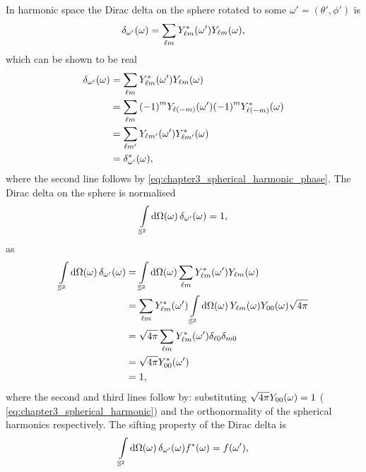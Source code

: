 In harmonic space the Dirac delta on the sphere rotated to some \(\omega'=(\theta',\phi')\) is
%
\begin{equation}
	\pixel{\delta_{\omega'}}
	= \harmonicSum \pixel[']{\conj{\harmonic{Y}}} \pixel{\harmonic{Y}},
\end{equation}
%
which can be shown to be real
%
\begin{align}\label{eq:chapter3_dirac_delta_real}
	\pixel{\delta_{\omega'}}
	 & = \harmonicSum \pixel[']{\conj{\harmonic{Y}}} \pixel{\harmonic{Y}} \nonumber{}                       \\
	 & = \harmonicSum {(-1)}^{m} \pixel[']{Y_{\ell(-m)}} {(-1)}^{m} \pixel{\conj{Y_{\ell(-m)}}} \nonumber{} \\
	 & = \sum\limits_{\ell m'} \pixel[']{Y_{\ell m'}} \pixel{\conj{Y_{\ell m'}}} \nonumber{}                \\
	 & = \pixel{\conj{\delta_{\omega'}}},
\end{align}
%
where the second line follows by \cref{eq:chapter3_spherical_harmonic_phase}.
The Dirac delta on the sphere is normalised
%
\begin{equation}
	\integrateSphere{\omega} \pixel{\delta_{\omega'}}
	= 1,
\end{equation}
%
as
%
\begin{align}
	\integrateSphere{\omega} \pixel{\delta_{\omega'}}
	 & = \integrateSphere{\omega} \harmonicSum \pixel[']{\conj{\harmonic{Y}}} \pixel{\harmonic{Y}} \nonumber{}                            \\
	 & = \harmonicSum \pixel[']{\conj{\harmonic{Y}}} \integrateSphere{\omega} \pixel{\harmonic{Y}} \pixel{Y_{00}} \sqrt{4\pi} \nonumber{} \\
	 & = \sqrt{4\pi} \harmonicSum \pixel[']{\conj{\harmonic{Y}}} \delta_{\ell0} \delta_{m0} \nonumber{}                                   \\
	 & = \sqrt{4\pi} \pixel[']{\conj{Y_{00}}} \nonumber{}                                                                                 \\
	 & = 1,
\end{align}
%
where the second and third lines follow by: substituting \(\sqrt{4\pi}\pixel{Y_{00}}=1\) (\cf{} \cref{eq:chapter3_spherical_harmonic}) and the orthonormality of the spherical harmonics respectively.
The sifting property of the Dirac delta is
%
\begin{equation}
	\integrateSphere{\omega} \pixel{\delta_{\omega'}} \pixel{\conj{f}}
	= \pixel[']{f},
\end{equation}
